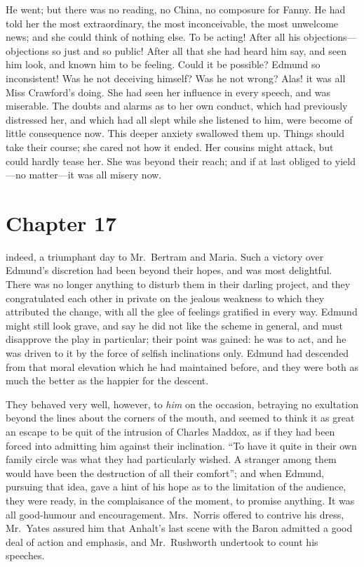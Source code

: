 He went; but there was no reading, no China, no composure
for Fanny.  He had told her the most extraordinary,
the most inconceivable, the most unwelcome news;
and she could think of nothing else.  To be acting!
After all his objections---objections so just and so public!
After all that she had heard him say, and seen him look,
and known him to be feeling.  Could it be possible?
Edmund so inconsistent!  Was he not deceiving himself?
Was he not wrong?  Alas! it was all Miss Crawford's doing.
She had seen her influence in every speech, and was miserable.
The doubts and alarms as to her own conduct, which had previously
distressed her, and which had all slept while she listened
to him, were become of little consequence now.  This deeper
anxiety swallowed them up.  Things should take their course;
she cared not how it ended.  Her cousins might attack,
but could hardly tease her.  She was beyond their reach;
and if at last obliged to yield---no matter---it was all
misery now.



\chapter{Chapter 17}

 indeed, a triumphant day to Mr.\ Bertram and Maria.
Such a victory over Edmund's discretion had been beyond
their hopes, and was most delightful.  There was no
longer anything to disturb them in their darling project,
and they congratulated each other in private on the
jealous weakness to which they attributed the change,
with all the glee of feelings gratified in every way.
Edmund might still look grave, and say he did not like the
scheme in general, and must disapprove the play in particular;
their point was gained:  he was to act, and he was
driven to it by the force of selfish inclinations only.
Edmund had descended from that moral elevation which he
had maintained before, and they were both as much the better
as the happier for the descent.

They behaved very well, however, to \emph{him} on the occasion,
betraying no exultation beyond the lines about the corners
of the mouth, and seemed to think it as great an escape
to be quit of the intrusion of Charles Maddox, as if they
had been forced into admitting him against their inclination.
``To have it quite in their own family circle was what
they had particularly wished.  A stranger among them
would have been the destruction of all their comfort'';
and when Edmund, pursuing that idea, gave a hint of his hope
as to the limitation of the audience, they were ready,
in the complaisance of the moment, to promise anything.
It was all good-humour and encouragement.  Mrs.\ Norris
offered to contrive his dress, Mr.\ Yates assured him
that Anhalt's last scene with the Baron admitted a good
deal of action and emphasis, and Mr.\ Rushworth undertook
to count his speeches.

